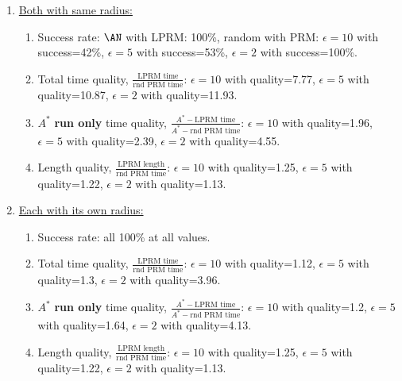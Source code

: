  \begin{enumerate}
     \item \underline{Both with same radius:} 
     \begin{enumerate}
        \item Success rate: $\AN$ with LPRM: 100\%, random with PRM: $\epsilon=10$ with success=42\%, $\epsilon=5$ with success=53\%, $\epsilon=2$ with success=100\%.
        \item Total time quality, $\frac{\text{LPRM time}}{\text{rnd PRM time}}$: $\epsilon=10$ with quality=7.77, $\epsilon=5$ with quality=10.87, $\epsilon=2$ with quality=11.93.
        \item $A^*$ \textbf{run only} time quality, $\frac{A^*-\text{LPRM time}}{A^*-\text{rnd PRM time}}$: $\epsilon=10$ with quality=1.96, $\epsilon=5$ with quality=2.39, $\epsilon=2$ with quality=4.55.
        \item Length quality, $\frac{\text{LPRM length}}{\text{rnd PRM time}}$: $\epsilon=10$ with quality=1.25, $\epsilon=5$ with quality=1.22, $\epsilon=2$ with quality=1.13.
     \end{enumerate}
     \item \underline{Each with its own radius:}
          \begin{enumerate}
         \item Success rate: all 100\% at all values.
         \item Total time quality, $\frac{\text{LPRM time}}{\text{rnd PRM time}}$: $\epsilon=10$ with quality=1.12, $\epsilon=5$ with quality=1.3, $\epsilon=2$ with quality=3.96.
        \item $A^*$ \textbf{run only} time quality, $\frac{A^*-\text{LPRM time}}{A^*-\text{rnd PRM time}}$: $\epsilon=10$ with quality=1.2, $\epsilon=5$ with quality=1.64, $\epsilon=2$ with quality=4.13.
         \item Length quality, $\frac{\text{LPRM length}}{\text{rnd PRM time}}$: $\epsilon=10$ with quality=1.25, $\epsilon=5$ with quality=1.22, $\epsilon=2$ with quality=1.13.
     \end{enumerate}
 \end{enumerate}

